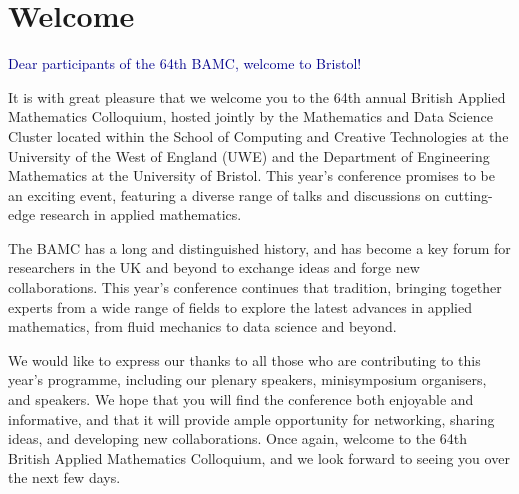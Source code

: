 \documentclass[12pt,a4paper]{article}
\begin{document}

\setcounter{page}{1}

\section{Welcome}

\thispagestyle{empty}


\textcolor{DarkBlue}{\large Dear participants of the 64th BAMC, welcome to Bristol!}

It is with great pleasure that we welcome you to the 64th annual British Applied Mathematics Colloquium, hosted jointly by the Mathematics and Data Science Cluster located within the School of Computing and Creative Technologies at the University of the West of England (UWE) and the Department of Engineering Mathematics at the University of Bristol. This year's conference promises to be an exciting event, featuring a diverse range of talks and discussions on cutting-edge research in applied mathematics.

The BAMC has a long and distinguished history, and has become a key forum for researchers in the UK and beyond to exchange ideas and forge new collaborations. This year's conference continues that tradition, bringing together experts from a wide range of fields to explore the latest advances in applied mathematics, from fluid mechanics to data science and beyond.

We would like to express our thanks to all those who are contributing to this year's programme, including our plenary speakers, minisymposium organisers, and speakers. We hope that you will find the conference both enjoyable and informative, and that it will provide ample opportunity for networking, sharing ideas, and developing new collaborations. Once again, welcome to the 64th British Applied Mathematics Colloquium, and we look forward to seeing you over the next few days.
\end{document}
